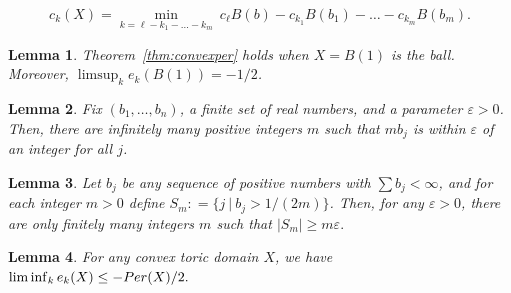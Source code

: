 \documentclass[10pt,a4paper]{amsart}
\newtheorem{lemma}{Lemma}
\newcommand{\Per}{{\rm Per}}
\newcommand{\eps}{\varepsilon}
\begin{document}
\begin{equation}
\label{eqn:echsub}
c_k(X) = \min_{k = \ell - k_1 - \ldots - k_m}\ c_\ell B(b) - c_{k_1} B(b_1) - \ldots - c_{k_m} B(b_m).
\end{equation}

\begin{lemma}\label{lem:Perball}  Theorem~\ref{thm:convexper}  holds when $X = B(1)$ is the ball. Moreover, 
$\limsup_k e_k(B(1)) = -1/2$.
\end{lemma}

\begin{lemma}\label{lem:warmup}
Fix $(b_1,\ldots,b_n)$, a finite set of real numbers, and a parameter $\eps> 0$.   Then, there are infinitely many positive integers $m$ such that $mb_j$ is within $\eps$ of an integer for all $j$.
\end{lemma}

\begin{lemma}\label{lem:warmup2} Let $b_j$ be any  sequence of positive numbers with $\sum b_j <\infty$, and for each integer $m>0$ 
define $S_m : = \{j \ | \ b_j>1/(2m)\}$.
Then, for any $\eps> 0$, there are only finitely many integers $m$  such that $|S_m| 
 \ge m\eps.$
\end{lemma}

\begin{lemma} \label{lem:ECHle} For any convex toric domain $X$,
we have
$\liminf_{k} e_k(X) \le - \Per(X)/2.$
\end{lemma}
\end{document}
